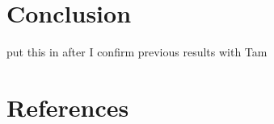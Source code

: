 \documentclass[titlesmallcaps, examinerscopy, copyrightpage]{uqthesis}
\newcommand{\red}{\color{red}}
\begin{document}
\chapter{Conclusion}

{\red put this in after I confirm previous results with Tam}






















\chapter*{References}
\begingroup
{}
\renewcommand{\addcontentsline}[3]{}
\renewcommand{\chapter}[2]{}

\endgroup
\end{document}
